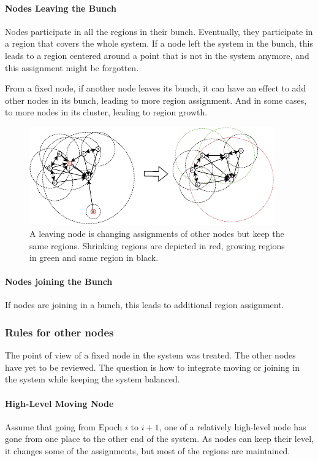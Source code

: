 \documentclass[a4paper,11pt,twoside,openright]{report}
\begin{document}
\paragraph{Nodes Leaving the Bunch} Nodes participate in all the regions in
their bunch. Eventually, they participate in a region that covers the
whole system. If a node left the system in the bunch, this leads to a region
centered around a point that is not in the system anymore, and this assignment might
be forgotten. 

From a fixed node, if another node leaves its bunch, it can have an effect to
add other nodes in its bunch, leading to more region assignment. And in some
cases, to more nodes in its cluster, leading to region growth. 

\begin{figure}[!h] \centering
  \includegraphics[width=300pt]{figures/LocarnoTreaties-Leaving-cluster}
  \caption{A leaving node is changing assignments of other nodes but keep the
  same regions. Shrinking regions are depicted in red, growing regions in
  green and same region in black. }
\label{fig:LocarnoTreaties-Leaving-cluster} \end{figure}

\paragraph{Nodes joining the Bunch} If nodes are joining in a bunch, this leads
to additional region assignment. 

\subsubsection{Rules for other nodes} The point of view of a fixed node in the
system was treated. The other nodes have yet to be reviewed. The
question is how to integrate moving or joining in the system while keeping the
system balanced. 

\paragraph{High-Level Moving Node} Assume that going from Epoch $i$ to $i+1$,
one of a relatively high-level node has gone from one place to the other end of
the system. As nodes can keep their level, it changes some of the
assignments, but most of the regions are maintained. 
\end{document}
